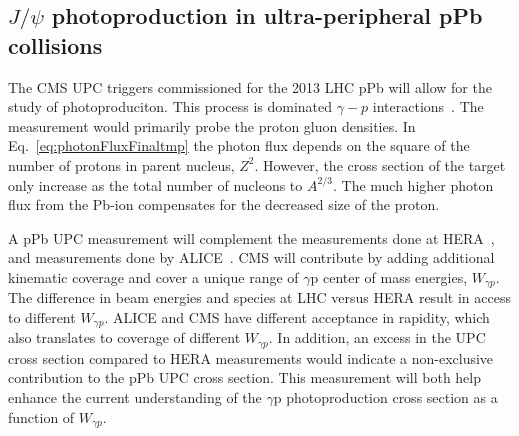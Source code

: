     \subsection{$J/\psi$ photoproduction in ultra-peripheral pPb collisions}
      The CMS UPC triggers commissioned for the 2013 LHC pPb will allow for the
        study of \JPsi{} photoproduciton.
      This process is dominated $\gamma-p$ interactions~\cite{Frankfurt:2006tp,Guzey:2013taa}.
      The measurement would primarily probe the proton gluon densities.
      In Eq.~\ref{eq:photonFluxFinaltmp} the photon flux depends on the square
      of the number of protons in parent nucleus, $Z^{2}$. 
      However, the cross section of the target only increase as the total 
        number of nucleons to $A^{2/3}$.
      The much higher photon flux from the Pb-ion compensates for 
        the decreased size of the proton.

      A pPb UPC \JPsi{} measurement will complement the measurements done at 
        HERA~\cite{Chekanov:2002xi,Aktas:2005xu,Alexa:2013xxa}, and measurements done by ALICE~\cite{TheALICE:2014dwa}.
      CMS will contribute by adding additional kinematic coverage and cover a 
        unique range of $\gamma$p center of mass energies, $W_{\gamma p}$. 
      The difference in beam energies and species at LHC versus HERA result in
        access to different $W_{\gamma p}$. 
      ALICE and CMS have different acceptance in \JPsi{} rapidity, which also 
        translates to coverage of different $W_{\gamma p}$.
      In addition, an excess in the UPC cross section compared to HERA 
        measurements would indicate a non-exclusive contribution to the pPb UPC 
        \JPsi{} cross section. 
      This measurement will both help enhance the current understanding of 
        the $\gamma$p \JPsi{} photoproduction cross section as a function of 
        $W_{\gamma p}$.

